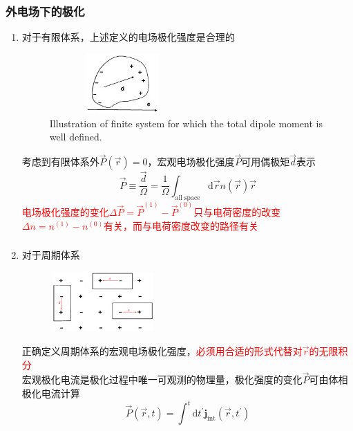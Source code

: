 \documentclass[cjk,slidestop,compress,mathserif,blue]{beamer}
\begin{document}
\frame
{
	\frametitle{外电场下的极化}
			\begin{enumerate}
				\item 对于有限体系，上述定义的电场极化强度是合理的
\begin{figure}[h!]
\centering
\vspace*{-0.15in}
\includegraphics[height=0.9in,width=2.2in,viewport=0 0 1100 550,clip]{Figures/Polarize_insulator.png}
\caption{\tiny \textrm{Illustration of finite system for which the total dipole moment is well defined.}}%
\label{Polarization_insulator}
\end{figure} 
考虑到有限体系外$\vec P(\vec r)=0$，宏观电场极化强度$\vec P$可用偶极矩$\vec d$表示
\begin{displaymath}
	\vec P\equiv\frac{\vec d}{\Omega}=\frac1{\Omega}\int_{\mathrm{all\;space}}\mathrm{d}\vec rn(\vec r)\vec r
\end{displaymath}
\textcolor{red}{电场极化强度的变化$\Delta\vec P=\vec P^{(1)}-\vec P^{(0)}$只与电荷密度的改变$\Delta n=n^{(1)}-n^{(0)}$有关，而与电荷密度改变的路径有关}
			\end{enumerate}
}

\frame
{
	\frametitle{}
			\begin{enumerate}
				\setcounter{enumi}{1}
				\item 对于周期体系
\begin{figure}[h!]
\centering
\vspace*{-0.15in}
\includegraphics[height=0.9in,width=1.6in,viewport=0 0 1100 540,clip]{Figures/Polarize_insulator-2.png}
\caption{\textrm{\fontsize{7.5pt}{5.2pt}\selectfont{Point charge model of an ionic crystal. The dipole is obviously not unique since the cells shown all have different moments.}}}%
\label{Polarization_insulator-2}
\end{figure} 
正确定义周期体系的宏观电场极化强度，\textcolor{red}{必须用合适的形式代替对$\vec r$的无限积分}\\
宏观极化电流是极化过程中唯一可观测的物理量，极化强度的变化$\vec P$可由体相极化电流计算
\begin{displaymath}
	\vec P(\vec r,t)=\int^t\mathrm{d}t^{\prime}\mathbf{j}_{\mathrm{int}}(\vec r,t^{\prime})
\end{displaymath}
			\end{enumerate}
}
\end{document}
